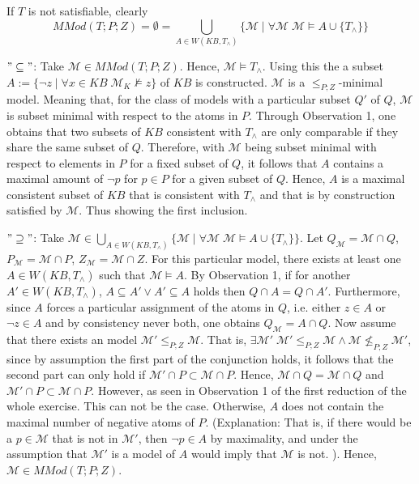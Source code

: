\documentclass[11pt,a4paper]{article}
\newcommand{\nmodels}{\not\models}
\begin{document}
\begin{enumerate}
\begin{itemize}
If $T$ is not satisfiable, clearly 
\begin{equation*}
\mathit{MMod}(T;P;Z) =\emptyset =\bigcup_{A \in W( \mathit{KB} , T_{\land})} \{ \mathcal{M} \mid \forall \mathcal{M} \; \mathcal{M} \models A \cup \{T_{\land} \}\}
\end{equation*}



$" \subseteq "$: Take $\mathcal{M} \in \mathit{MMod}(T;P;Z)$. Hence, $\mathcal{M} \models T_{\land}$. Using this the a subset $A:=\{ \neg z \mid \forall x \in \mathit{KB}\; \mathcal{M}_K \nmodels z \}$ of $\mathit{KB}$ is constructed. $\mathcal{M}$ is a $\leq_{P;Z}$-minimal model. Meaning that, for the class of models with a particular subset $Q'$ of $Q$, $\mathcal{M}$ is subset minimal with respect to the atoms in $P$. Through Observation 1, one obtains that two subsets of $\mathit{KB}$ consistent with $T_{\land}$ are only comparable if they share the same subset of $Q$. Therefore, with $\mathcal{M}$ being subset minimal with respect to elements in $P$ for a fixed subset of $Q$, it follows that $A$ contains a maximal amount of $\neg p$ for $p\in P$ for a given subset of $Q$. Hence, $A$ is a maximal consistent subset of $\mathit{KB}$ that is consistent with $T_{\land}$ and that is by construction satisfied by $\mathcal{M}$. Thus showing the first inclusion.

$" \supseteq "$: Take $\mathcal{M} \in  \bigcup_{A \in W( \mathit{KB} , T_{\land})} \{ \mathcal{M} \mid \forall \mathcal{M} \; \mathcal{M} \models A \cup \{T_{\land} \}\}$. Let $Q_{\mathcal{M}} = \mathcal{M} \cap Q$, $P_{\mathcal{M}} = \mathcal{M} \cap P$, $Z_{\mathcal{M}} = \mathcal{M} \cap Z$. For this particular model, there exists at least one $A \in W( \mathit{KB} , T_{\land})$ such that $\mathcal{M}\models A$. By Observation 1, if for another $A'\in W( \mathit{KB} , T_{\land})$, $A \subseteq A' \lor A' \subseteq A$ holds then $Q \cap A = Q \cap A'$. Furthermore, since $A$ forces a particular assignment of the atoms in $Q$, i.e. either $z \in A$ or $\neg z \in A$ and by consistency never both, one obtains $Q_{\mathcal{M}}  =A \cap Q $. Now assume that there exists an model $\mathcal{M}' \leq_{P;Z} \mathcal{M}$. That is, $\exists \mathcal{M}' \; \mathcal{M}' \leq_{P;Z} \mathcal{M} \land  \mathcal{M} \nleq_{P;Z} \mathcal{M}' $, since by assumption the first part of the conjunction holds, it follows that the second part can only hold if $\mathcal{M}' \cap P \subset \mathcal{M} \cap P$. Hence, $\mathcal{M} \cap Q = \mathcal{M} \cap Q$ and $\mathcal{M}' \cap P \subset \mathcal{M} \cap P$. However, as seen in Observation 1 of the first reduction of the whole exercise. This can not be the case. Otherwise, $A$ does not contain the maximal number of negative atoms of $P$. (Explanation: That is, if there would be a $p \in \mathcal{M}$ that is not in $\mathcal{M}'$, then $\neg p \in A$ by maximality, and under the assumption that $\mathcal{M}'$ is a model of $A$ would imply that $\mathcal{M}$ is not. ). Hence, $\mathcal{M} \in \mathit{MMod}(T;P;Z)$. \\



\end{itemize}
\end{enumerate}
\end{document}
